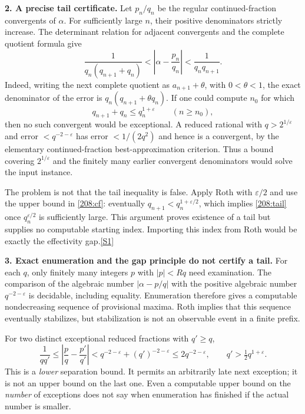 \documentclass[11pt,a4paper]{article}
\newcommand{\eps}{\varepsilon}
\newcommand{\sref}[2]{\hyperlink{source:#1:#2}{[S#2]}}
\begin{document}
\textbf{2. A precise tail certificate.}
Let $p_n/q_n$ be the regular continued-fraction convergents of $\alpha$.
For sufficiently large $n$, their positive denominators strictly increase.
The determinant relation for adjacent convergents and the complete
quotient formula give
\begin{equation}\label{208:cf}
 \frac{1}{q_n(q_{n+1}+q_n)}
 <\left|\alpha-\frac{p_n}{q_n}\right|
 <\frac{1}{q_nq_{n+1}}.
\end{equation}
Indeed, writing the next complete quotient as $a_{n+1}+\theta$, with
$0<\theta<1$, the exact denominator of the error is
$q_n(q_{n+1}+\theta q_n)$.
If one could compute $n_0$ for which
\begin{equation}\label{208:tail}
 q_{n+1}+q_n\le q_n^{1+\eps}\qquad(n\ge n_0),
\end{equation}
then no such convergent would be exceptional. A reduced rational with
$q>2^{1/\eps}$ and error $<q^{-2-\eps}$ has error $<1/(2q^2)$ and hence
is a convergent, by the elementary continued-fraction best-approximation
criterion. Thus a bound covering $2^{1/\eps}$ and the finitely many earlier
convergent denominators would solve the input instance.

The problem is not that the tail inequality is false. Apply Roth with
$\eps/2$ and use the upper bound in \eqref{208:cf}: eventually
$q_{n+1}<q_n^{1+\eps/2}$, which implies \eqref{208:tail} once
$q_n^{\eps/2}$ is sufficiently large. This argument proves existence of a
tail but supplies no computable starting index. Importing this index from
Roth would be exactly the effectivity gap.\sref{208}{1}

\textbf{3. Exact enumeration and the gap principle do not certify a tail.}
For each $q$, only finitely many integers $p$ with $|p|<Rq$ need examination.
The comparison of the algebraic number $|\alpha-p/q|$ with the positive
algebraic number $q^{-2-\eps}$ is decidable, including equality. Enumeration
therefore gives a computable nondecreasing sequence of provisional maxima.
Roth implies that this sequence eventually stabilizes, but stabilization
is not an observable event in a finite prefix.

For two distinct exceptional reduced fractions with $q'\ge q$,
\[
 \frac1{qq'}\le\left|\frac pq-\frac{p'}{q'}\right|
 <q^{-2-\eps}+(q')^{-2-\eps}\le2q^{-2-\eps},
 \qquad q'>\tfrac12q^{1+\eps}.
\]
This is a \emph{lower} separation bound. It permits an arbitrarily late
next exception; it is not an upper bound on the last one. Even a computable
upper bound on the \emph{number} of exceptions does not say when enumeration
has finished if the actual number is smaller.
\end{document}
